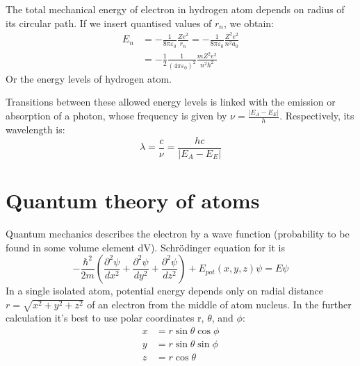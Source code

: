 \documentclass{report}
\begin{document}
The total mechanical energy of electron in hydrogen atom depends on radius of its circular path. If we insert quantised values of $r_n$, we obtain:
\begin{align*}
    E_n &= - \frac{1}{8\pi \varepsilon_0} \frac{Z e^2}{r_n} =  - \frac{1}{8\pi \varepsilon_0} \frac{Z^2 e^2}{n^2 a_0} \\ 
    &= - \frac{1}{2} \frac{1}{(4\pi \varepsilon_0)^2} \frac{m Z^2 e^2}{n^2 \hbar^2}
\end{align*}
Or the energy levels of hydrogen atom.

Transitions between these allowed energy levels is linked with the emission or absorption of a photon, whose frequency is given by $\nu = \frac{|E_A - E_E|}{h}$. Respectively, its wavelength is:
\begin{equation}
    \lambda = \frac{c}{\nu} = \frac{hc}{ |E_A - E_E|}
\end{equation}

\section{Quantum theory of atoms}
Quantum mechanics describes the electron by a wave function (probability to be found in some volume element dV). Schrödinger equation for it is
\begin{equation}
    - \frac{\hbar^2}{2m}\left( \frac{\partial^2 \psi}{dx^2} + \frac{\partial^2 \psi}{dy^2} + \frac{\partial^2 \psi}{dz^2}\right) + E_{pot}(x, y, z)\psi = E\psi
\end{equation}
In a single isolated atom, potential energy depends only on radial distance $r = \sqrt{x^2+y^2+z^2}$ of an electron from the middle of atom nucleus. In the further calculation it's best to use polar coordinates r, $\theta$, and $\phi$:
\begin{align*}
    x &= r \sin\theta \cos\phi \\
    y &= r \sin\theta \sin\phi \\
    z &= r \cos\theta 
\end{align*}
\end{document}
